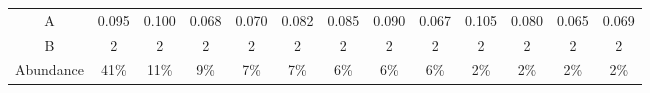 \begin{tabular}{ccccccccccccc}
   \hline
A & 0.095 & 0.100 & 0.068 & 0.070 & 0.082 & 0.085 & 0.090 & 0.067 & 0.105 & 0.080 & 0.065 & 0.069 \\ 
  B & 2 & 2 & 2 & 2 & 2 & 2 & 2 & 2 & 2 & 2 & 2 & 2 \\ 
  Abundance & 41\% & 11\% & 9\% & 7\% & 7\% & 6\% & 6\% & 6\% & 2\% & 2\% & 2\% & 2\% \\ 
   \hline
\end{tabular}
